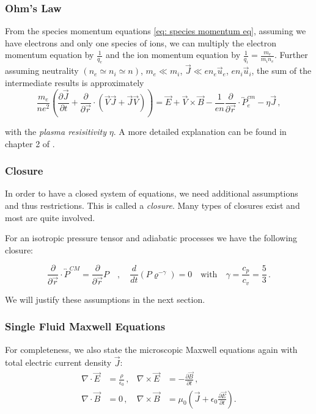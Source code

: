 \subsubsection{Ohm's Law}

From the species momentum equations \eqref{eq: species momentum eq}, assuming 
we have electrons and only one species of ions, we can multiply the electron momentum equation
by $\frac{1}{q_e}$ and the ion momentum equation by $\frac{1}{q_i} = \frac{m_e}{m_i n_e}$.
Further assuming neutrality $(n_e \simeq n_i \simeq n)$, $m_e \ll m_i$, $\vec{J} \ll e n_e \vec{u}_e$, $e n_i \vec{u}_i$,
the sum of the intermediate results is approximately
\begin{equation*}
    \frac{m_e}{n e^2} \left(\frac{\partial \vec{J}}{\partial t} + \frac{\partial}{\partial \vec{r}} \cdot (\vec{V}\vec{J} + \vec{J}\vec{V})\right)
     = \vec{E} + \vec{V} \times \vec{B} - \frac{1}{en} \frac{\partial}{\partial \vec{r}} \cdot \overleftrightarrow{P}_e^{cm} - \eta \vec{J}  \, ,
\end{equation*}

with the \emph{plasma resisitivity} $\eta$.
A more detailed explanation can be found in chapter 2 of \cite{Freidberg2014}.


\subsubsection{Closure}

In order to have a closed system of equations, we need additional assumptions and thus restrictions. This is called a \emph{closure}.
Many types of closures exist and most are quite involved.

For an isotropic pressure tensor and adiabatic processes we have the following closure:

\[
\frac{\partial}{\partial \vec{r}} \cdot \overleftrightarrow{P}^{CM} = \frac{\partial}{\partial \vec{r}} P \quad, \quad \frac{d}{dt} (P \varrho^{-\gamma}) = 0 \quad \text{with} \quad \gamma = \frac{c_p}{c_v}= \frac{5}{3}  \, .
\]



We will justify these assumptions in the next section.


\subsubsection{Single Fluid Maxwell Equations}
For completeness, we also state the microscopic Maxwell equations again with total electric current density $\vec{J}$:
\begin{align}
\nabla \cdot \vec{E} &= \frac{\rho}{\epsilon_0} \, , & \nabla \times \vec{E} &= -\frac{\partial \vec{B}}{\partial t}  \, , \\
\nabla \cdot \vec{B} &= 0   \, , & \nabla \times \vec{B} &= \mu_0 \left(\vec{J} + \epsilon_0 \frac{\partial \vec{E}}{\partial t}\right).
\label{eq: single fluid maxwell eq}
\end{align}








